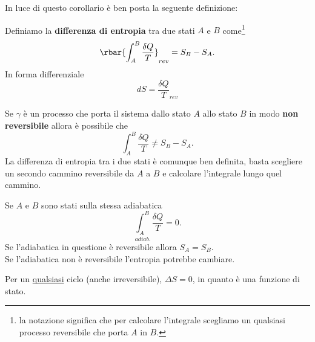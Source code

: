 \noindent In luce di questo corollario \`e ben posta la seguente definizione:

\begin{definition}[Entropia]
Definiamo la \textbf{differenza di entropia} tra due stati $A$ e $B$ come\footnote{la notazione significa che per calcolare l'integrale scegliamo un qualsiasi processo reversibile che porta $A$ in $B$.}
\[\rbar{\int_A^B\frac{\delta Q}T}_{rev}=S_B-S_A.\]
In forma differenziale
\[dS=\frac{\delta Q}{T}_{rev}\]
\end{definition}

\begin{remark}
Se $\gamma$ \`e un processo che porta il sistema dallo stato $A$ allo stato $B$ in modo \textbf{non reversibile} allora \`e possibile che\[\int_A^B\frac{\delta Q}T\neq S_B-S_A.\]
La differenza di entropia tra i due stati \`e comunque ben definita, basta scegliere un secondo cammino reversibile da $A$ a $B$ e calcolare l'integrale lungo quel cammino.
\end{remark}

\begin{remark}
Se $A$ e $B$ sono stati sulla stessa adiabatica \[\underset{adiab.}{\int_A^B}\frac{\delta Q}T=0.\] 
Se l'adiabatica in questione \`e reversibile allora $S_A=S_B$.\\
Se l'adiabatica non \`e reversibile l'entropia potrebbe cambiare.
\end{remark}

\begin{remark}
Per un \underline{qualsiasi} ciclo (anche irreversibile), $\Delta S=0$, in quanto \`e una funzione di stato.
\end{remark}

